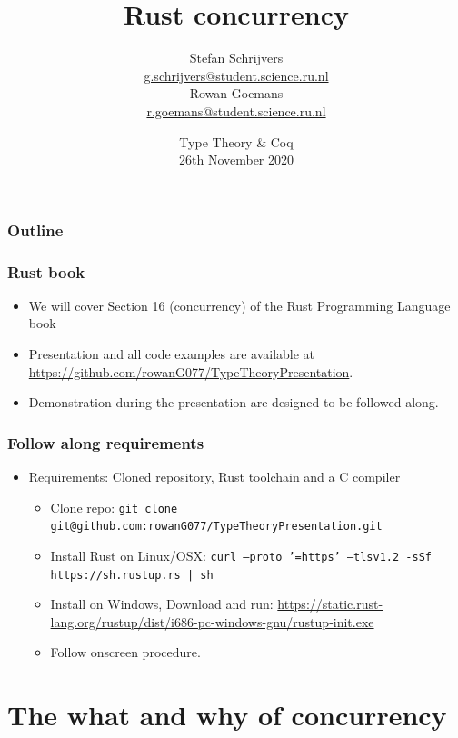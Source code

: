 \documentclass{beamer}
\title[Rust concurrency]{
  Rust concurrency}
\author[Stefan S. \& Rowan G.]{
  Stefan Schrijvers \\
  {\small \url{g.schrijvers@student.science.ru.nl}} \\
  \medskip
  Rowan Goemans \\
  {\small \url{r.goemans@student.science.ru.nl}} \\ 
  }
\institute[Radboud University Nijmegen]{
  Radboud University Nijmegen}
\date[Type Theory \& Coq 2020]{
  Type Theory \& Coq \\
  26th November 2020}
\begin{document}
\begin{frame}
  \titlepage
\end{frame}

\begin{frame}
  \frametitle{Outline}

  \tableofcontents
\end{frame}

\begin{frame}
  \frametitle{Rust book}

  \begin{itemize}
    \item We will cover Section 16 (concurrency) of the Rust Programming Language book \cite{rust-book}
    \item Presentation and all code examples are available at \url{https://github.com/rowanG077/TypeTheoryPresentation}.
    \item Demonstration during the presentation are designed to be followed along.
  \end{itemize}
\end{frame}

\begin{frame}
  \frametitle{Follow along requirements}
  \begin{itemize}
  \item Requirements: Cloned repository, Rust toolchain and a C compiler
    \begin{itemize}
        \item Clone repo: \texttt{git clone git@github.com:rowanG077/TypeTheoryPresentation.git}
        \item Install Rust on Linux/OSX: \texttt{curl --proto '=https' --tlsv1.2 -sSf https://sh.rustup.rs | sh}
        \item Install on Windows, Download and run: \url{https://static.rust-lang.org/rustup/dist/i686-pc-windows-gnu/rustup-init.exe}
        \item Follow onscreen procedure.
    \end{itemize}
  \end{itemize}
\end{frame}

\section{The what and why of concurrency}
\end{document}
